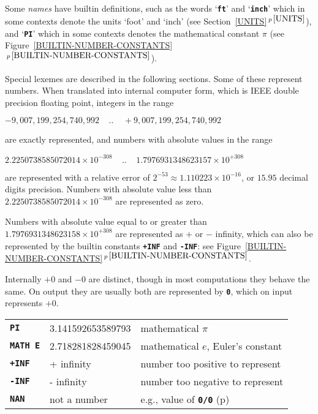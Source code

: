 \documentclass[12pt]{article}
\makeatletter
\newcommand{\TT}[1]{{\tt \bfseries #1}}
\newcommand{\ttkey}[1]{\TT{#1}\index{#1@{\tt #1}}}
\newcommand{\itemref}[1]{\ref{#1}$\,^{p\,\pageref{#1}}$}
\newcommand{\pagref}[1]{p\pageref{#1}}
\newlength{\figurewidth}
\newenvironment{boxedfigure}[1][!btp]%
	{\begin{figure*}[#1]
	 \begin{lrbox}{\figurebox}
	 \begin{minipage}{\figurewidth}

	 \vspace*{1ex}}%
	{
	 \vspace*{1ex}

	 \end{minipage}
	 \end{lrbox}
	 \begin{center}
	 \fbox{\hspace*{0.1in}\usebox{\figurebox}\hspace*{0.1in}}
	 \end{center}
	 \end{figure*}}
\makeatother
\begin{document}
Some {\em names} have builtin definitions, such as the
words `\TT{ft}' and `\TT{inch}' which in some contexts denote the
units `foot' and `inch' (see Section~\itemref{UNITS}),
and `\TT{PI}' which in some contexts denotes the mathematical
constant $\pi$ (see Figure~\itemref{BUILTIN-NUMBER-CONSTANTS}).

Special lexemes are described in the following sections.  Some of these
represent numbers.  When translated into internal computer form,
which is IEEE double precision floating point,
integers in the range
\begin{center}
$-9,007,199,254,740,992~~~~~..~~~~~+9,007,199,254,740,992$
\end{center}
are exactly represented, and numbers with absolute values in the range
\begin{center}
$2.2250738585072014\times 10^{-308}~~~~~..~~~~~1.7976931348623157\times
                                                               10^{+308}$
\end{center}
are represented with a relative error of
$2^{-53} \approx 1.110223\times 10^{-16}$,
or $15.95$ decimal digits precision.  Numbers with absolute value less than
$2.2250738585072014\times 10^{-308}$ are represented as zero.

Numbers with absolute value equal to or greater than
$1.7976931348623158\times 10^{+308}$ are represented as $+$ or $-$
infinity, which can also be represented by the builtin constants
\TT{+INF} and \TT{-INF}: see Figure~\itemref{BUILTIN-NUMBER-CONSTANTS}.

Internally $+0$ and $-0$ are distinct, though in most computations
they behave the same.  On output they are usually
both are represented by \TT{0}, which on input represents $+0$.

\begin{boxedfigure}[t]

\begin{center}
\begin{tabular}{lll}
\ttkey{PI}	& 3.141592653589793 & mathematical $\pi$ \\
\ttkey{MATH E}	& 2.718281828459045 & mathematical $e$, Euler's constant \\
\ttkey{+INF}	& + infinity & number too positive to represent \\
\ttkey{-INF}	& - infinity & number too negative to represent \\
\ttkey{NAN}	& not a number & e.g., value of \TT{0/0} (\pagref{0/0}) \\
\end{tabular}
\end{center}
\vspace*{-3ex}
\caption{Builtin Number Constants}
\label{BUILTIN-NUMBER-CONSTANTS}
\end{boxedfigure}
\end{document}
